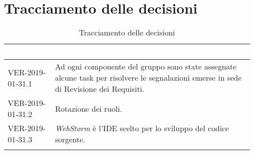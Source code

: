 
\section{Tracciamento delle decisioni}

\begin{longtable}{|C{.40\textwidth}|C{.60\textwidth}|}
\hline
{}\textbf{\textcolor{white}{Codice}} & \textbf{\textcolor{white}{Decisione}}\\
\hline
VER-2019-01-31.1 & Ad ogni componente del gruppo sono state assegnate alcune task per risolvere 
le segnalazioni emerse in sede di Revisione dei Requisiti. \\
\hline
{}VER-2019-01-31.2 & Rotazione dei ruoli. \\
\hline
VER-2019-01-31.3 & \textit{WebStorm} è l'IDE scelto per lo sviluppo del codice sorgente. \\
\hline

\caption{Tracciamento delle decisioni}
\end{longtable}

